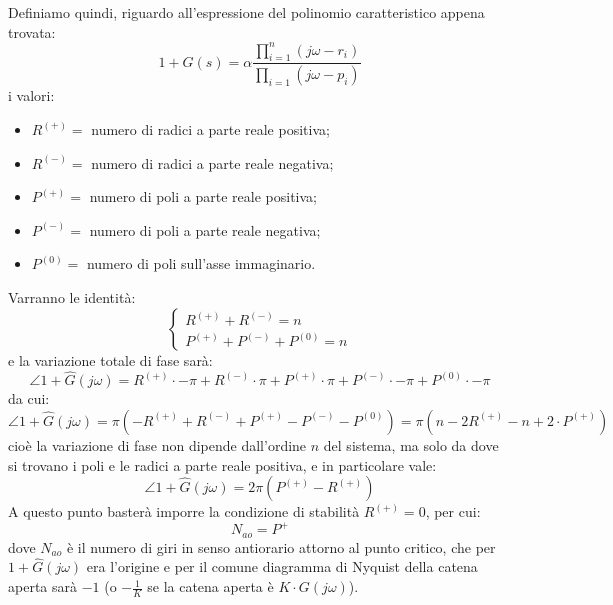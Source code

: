 \documentclass[a4paper,11pt]{article}
\begin{document}
Definiamo quindi, riguardo all'espressione del polinomio caratteristico appena trovata:
$$
1 + \hat{G}(s) = \alpha \frac{ \prod_{i = 1}^n (j \omega - r_i) }{ \prod_{i = 1}(j \omega - p_i) }
$$
i valori:
\begin{itemize}
	\item $R^{(+)} =$ numero di radici a parte reale positiva;
	\item $R^{(-)} =$ numero di radici a parte reale negativa;
	\item $P^{(+)} =$ numero di poli a parte reale positiva;
	\item $P^{(-)} =$ numero di poli a parte reale negativa;
	\item $P^{(0)} =$ numero di poli sull'asse immaginario.
\end{itemize}
Varranno le identità:
\[
	\begin{cases}
		R^{(+)} + R^{(-)} = n \\
		P^{(+)} + P^{(-)} + P^{(0)} = n
	\end{cases}
\]
e la variazione totale di fase sarà:
$$
\angle 1 + \hat{G}(j \omega) = R^{(+)} \cdot - \pi + R^{(-)} \cdot \pi + P^{(+)} \cdot \pi + P^{(-)} \cdot - \pi + P^{(0)} \cdot - \pi
$$
da cui:
$$
\angle 1 + \hat{G}(j \omega) = \pi \left( -R^{(+)} + R^{(-)} + P^{(+)} - P^{(-)} - P^{(0)} \right) 
= \pi \left( n - 2 R^{(+)} - n + 2 \cdot P^{(+)} \right)
$$
cioè la variazione di fase non dipende dall'ordine $n$ del sistema, ma solo da dove si trovano i poli e le radici a parte reale positiva, e in particolare vale:
$$
\angle 1 + \hat{G}(j \omega) = 2 \pi \left( P^{(+)} - R^{(+)} \right)
$$
A questo punto basterà imporre la condizione di stabilità $R^{(+)} = 0$, per cui:
$$
N_{ao} = P^+
$$
dove $N_{ao}$ è il numero di giri in senso antiorario attorno al punto critico, che per $1 + \hat{G}(j\omega)$ era l'origine e per il comune diagramma di Nyquist della catena aperta sarà $-1$ (o $-\frac{1}{K}$ se la catena aperta è $K \cdot G(j\omega)$).
\end{document}
